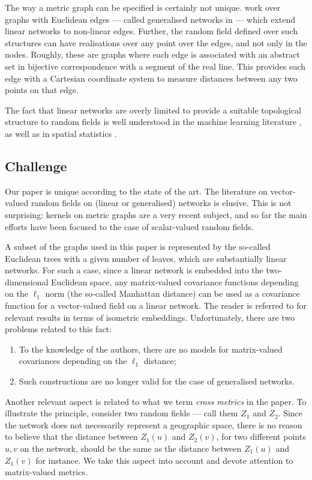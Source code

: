 \documentclass[12pt]{article}
\theoremstyle{plain}
\theoremstyle{remark}
\begin{document}
    The way a metric graph can be specified is certainly not unique. \cite{anderes_isotropic_2020} work over graphs with Euclidean edges --- called generalised networks in \cite{porcu2023stationary} --- which extend linear networks to non-linear edges. Further, the {random field} defined over such structures can have realisations over any point over the edges, and not only in the nodes. Roughly, these are graphs where each edge is associated with an abstract set in bijective correspondence with a segment of the real line. This provides each edge with a Cartesian coordinate system to measure distances between any two points on that edge. \par
    The fact that linear networks are overly limited to provide a suitable topological structure to {random fields} is well understood in the machine learning literature  \citep{alsheikh2014machine,  hamilton2017representation,  borovitskiy2022isotropic}, as well as in spatial statistics \citep{cressie2006spatial,  ver2006spatial, peterson2013modelling, peterson2007geostatistical, montembeault2012impact, xiao2017modeling, perry2013point, deng2014ginibre, baddeley2017stationary}.

\subsection{Challenge}
    Our paper is unique according to the state of the art. The literature on vector-valued random fields on (linear or generalised) networks is elusive. This is not surprising: kernels on metric graphs are a very recent subject, and so far the main efforts have been focused to the case of scalar-valued random fields. \par
    A subset of the graphs used in this paper is represented by the so-called Euclidean trees with a given number of leaves, which are substantially linear networks. For such a case, since a linear network is embedded into the two-dimensional Euclidean space, any matrix-valued covariance functions depending on the $\ell_1$ norm (the so-called Manhattan distance) can be used as a covariance function for a vector-valued field on a linear network. The reader is referred to \cite{zastavnyi_positive_2000} for relevant results in terms of isometric embeddings. Unfortunately, there are two problems related to this fact: 
    \begin{enumerate}
        \item To the knowledge of the authors, there are no models for matrix-valued covariances depending on the $\ell_1$ distance;
        \item Such constructions are no longer valid for the case of generalised networks.
    \end{enumerate}
    Another relevant aspect is related to what we term {\em cross metrics} in the paper. To illustrate the principle, consider two {random fields} --- call them $Z_1$ and $Z_2$. Since the network does not necessarily represent a geographic space, there is no reason to believe that the distance between $Z_1(u)$ and $Z_2(v)$, for two different points $u,v$ {on the network}, should be the same as the distance between $Z_1(u)$ and $Z_1(v)$ for instance. We take this aspect into account and devote attention to matrix-valued metrics.
\end{document}
